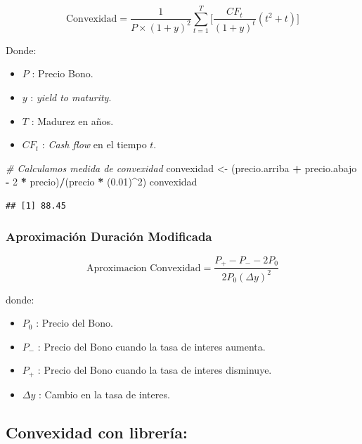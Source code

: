 \documentclass[12pt,]{book}
\newenvironment{Shaded}{\begin{snugshade}}{\end{snugshade}}
\newcommand{\DecValTok}[1]{\textcolor[rgb]{0.00,0.00,0.81}{#1}}
\newcommand{\FloatTok}[1]{\textcolor[rgb]{0.00,0.00,0.81}{#1}}
\newcommand{\StringTok}[1]{\textcolor[rgb]{0.31,0.60,0.02}{#1}}
\newcommand{\CommentTok}[1]{\textcolor[rgb]{0.56,0.35,0.01}{\textit{#1}}}
\newcommand{\OperatorTok}[1]{\textcolor[rgb]{0.81,0.36,0.00}{\textbf{#1}}}
\newcommand{\NormalTok}[1]{#1}
\providecommand{\tightlist}{%
  \setlength{\itemsep}{0pt}\setlength{\parskip}{0pt}}
\begin{document}
\[
\text{Convexidad} = \frac{1}{P \times (1+y)^2} \sum_{t=1}^{T} \bigg[ \frac{CF_{t}}{(1 + y)^t } (t^2 + t) \bigg]
\]

Donde:

\begin{itemize}
\tightlist
\item
  \(P\) : Precio Bono.
\item
  \(y\) : \emph{yield to maturity}.
\item
  \(T\) : Madurez en años.
\item
  \(CF_{t}\) : \emph{Cash flow} en el tiempo \(t\).
\end{itemize}

\begin{Shaded}
\begin{Highlighting}[]
\CommentTok{# Calculamos medida de convexidad}
\NormalTok{convexidad <-}\StringTok{ }\NormalTok{(precio.arriba }\OperatorTok{+}\StringTok{ }\NormalTok{precio.abajo  }\OperatorTok{-}\StringTok{ }\DecValTok{2} \OperatorTok{*}\StringTok{ }\NormalTok{precio)}\OperatorTok{/}\NormalTok{(precio }\OperatorTok{*}\StringTok{ }\NormalTok{(}\FloatTok{0.01}\NormalTok{)}\OperatorTok{^}\DecValTok{2}\NormalTok{)}
\NormalTok{convexidad}
\end{Highlighting}
\end{Shaded}

\begin{verbatim}
## [1] 88.45
\end{verbatim}

\subsubsection{Aproximación Duración
Modificada}\label{aproximacion-duracion-modificada-1}

\[
\text{Aproximacion Convexidad} = \frac{P_{+} - P_{-} - 2P_{0}}{2P_{0}(\Delta y)^2}
\]

donde:

\begin{itemize}
\tightlist
\item
  \(P_{0}\) : Precio del Bono.
\item
  \(P_{-}\) : Precio del Bono cuando la tasa de interes aumenta.
\item
  \(P_{+}\) : Precio del Bono cuando la tasa de interes disminuye.
\item
  \(\Delta y\) : Cambio en la tasa de interes.
\end{itemize}

\subsection{Convexidad con librería:}\label{convexidad-con-libreria}
\end{document}
